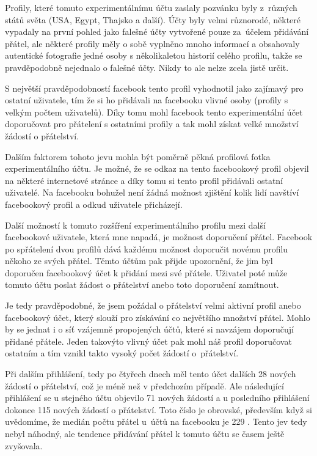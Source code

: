 \documentclass[thesis=M,czech]{FITthesis}[2013/05/10]
\begin{document}
Profily, které tomuto experimentálnímu účtu zaslaly pozvánku byly z~různých států světa (USA, Egypt, Thajsko a další). Účty byly velmi různorodé, některé vypadaly na první pohled jako falešné účty vytvořené pouze za~účelem přidávání přátel, ale některé profily měly o sobě vyplněno mnoho informací a obsahovaly autentické fotografie jedné osoby s několikaletou historií celého profilu, takže se pravděpodobně nejednalo o falešné účty. Nikdy to ale nelze zcela jistě určit. 

S největší pravděpodobností facebook tento profil vyhodnotil jako zajímavý pro ostatní uživatele, tím že si ho přidávali na facebooku vlivné osoby (profily s velkým počtem uživatelů). Díky tomu mohl facebook tento experimentální účet doporučovat pro přátelení s ostatními profily a tak mohl získat velké množství žádostí o přátelství.

Dalším faktorem tohoto jevu mohla být poměrně pěkná profilová fotka experimentálního účtu. Je možné, že se odkaz na tento facebookový profil objevil na některé internetové stránce a díky tomu si tento profil přidávali ostatní uživatelé. Na facebooku bohužel není žádná možnost zjištění kolik lidí navštíví facebookový profil a odkud uživatele přicházejí.

Další možností k tomuto rozšíření experimentálního profilu mezi další facebookové uživatele, která mne napadá, je možnost doporučení přátel. Facebook po spřátelení dvou profilů dává každému možnost doporučit novému profilu někoho ze svých přátel. Těmto účtům pak přijde upozornění, že jim byl doporučen facebookový  účet k přidání mezi své přátele. Uživatel poté může tomuto účtu poslat žádost o přátelství anebo toto doporučení zamítnout. 

Je tedy pravděpodobné, že jsem požádal o přátelství velmi aktivní profil anebo facebookový účet, který slouží pro získávání co největšího množství přátel. Mohlo by se jednat i o síť vzájemně propojených účtů, které si navzájem doporučují přidané přátele. Jeden takovýto vlivný účet pak mohl náš profil doporučovat ostatním a tím vznikl takto vysoký počet žádostí o~přátelství.

Při dalším přihlášení, tedy po čtyřech dnech měl tento účet dalších 28 nových žádostí o přátelství, což je méně než v předchozím případě. Ale následující přihlášení se u stejného účtu objevilo 71 nových žádostí a u posledního přihlášení dokonce 115 nových žádostí o přátelství. Toto číslo je obrovské, především když si uvědomíme, že medián počtu přátel u~účtů na facebooku je 229 \cite{web:fbFriendsMedian}. Tento jev tedy nebyl náhodný, ale tendence přidávání přátel k tomuto účtu se časem ještě zvyšovala.
\end{document}
